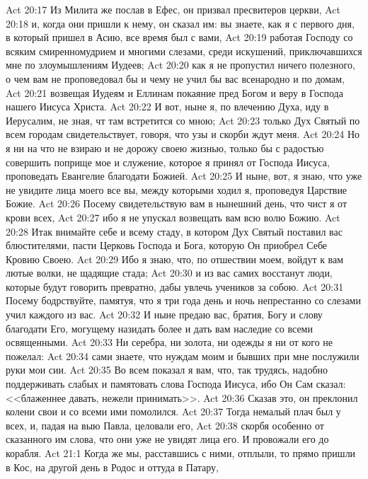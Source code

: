 \rsbpar\vs Act 20:17 Из Милита же послав в Ефес, он призвал пресвитеров церкви,
\vs Act 20:18 и, когда они пришли к нему, он сказал им: вы знаете, как я с первого дня, в который пришел в Асию, все время был с вами,
\vs Act 20:19 работая Господу со всяким смиренномудрием и многими слезами, среди искушений, приключавшихся мне по злоумышлениям Иудеев;
\vs Act 20:20 как я не пропустил ничего полезного, о чем вам не проповедовал бы и чему не учил бы вас всенародно и по домам,
\vs Act 20:21 возвещая Иудеям и Еллинам покаяние пред Богом и веру в Господа нашего Иисуса Христа.
\vs Act 20:22 И вот, ныне я, по влечению Духа, иду в Иерусалим, не зная, чт там встретится со мною;
\vs Act 20:23 только Дух Святый по всем городам свидетельствует, говоря, что узы и скорби ждут меня.
\vs Act 20:24 Но я ни на что не взираю и не дорожу своею жизнью, только бы с радостью совершить поприще мое и служение, которое я принял от Господа Иисуса, проповедать Евангелие благодати Божией.
\vs Act 20:25 И ныне, вот, я знаю, что уже не увидите лица моего все вы, между которыми ходил я, проповедуя Царствие Божие.
\vs Act 20:26 Посему свидетельствую вам в нынешний день, что чист я от крови всех,
\vs Act 20:27 ибо я не упускал возвещать вам всю волю Божию.
\vs Act 20:28 Итак внимайте себе и всему стаду, в котором Дух Святый поставил вас блюстителями, пасти Церковь Господа и Бога, которую Он приобрел Себе Кровию Своею.
\vs Act 20:29 Ибо я знаю, что, по отшествии моем, войдут к вам лютые волки, не щадящие стада;
\vs Act 20:30 и из вас самих восстанут люди, которые будут говорить превратно, дабы увлечь учеников за собою.
\vs Act 20:31 Посему бодрствуйте, памятуя, что я три года день и ночь непрестанно со слезами учил каждого из вас.
\vs Act 20:32 И ныне предаю вас, братия, Богу и слову благодати Его, могущему назидать  более и дать вам наследие со всеми освященными.
\vs Act 20:33 Ни серебра, ни золота, ни одежды я ни от кого не пожелал:
\vs Act 20:34 сами знаете, что нуждам моим и  бывших при мне послужили руки мои сии.
\vs Act 20:35 Во всем показал я вам, что, так трудясь, надобно поддерживать слабых и памятовать слова Господа Иисуса, ибо Он Сам сказал: <<блаженнее давать, нежели принимать>>.
\vs Act 20:36 Сказав это, он преклонил колени свои и со всеми ими помолился.
\vs Act 20:37 Тогда немалый плач был у всех, и, падая на выю Павла, целовали его,
\vs Act 20:38 скорбя особенно от сказанного им слова, что они уже не увидят лица его. И провожали его до корабля.
\vs Act 21:1 Когда же мы, расставшись с ними, отплыли, то прямо пришли в Кос, на другой день в Родос и оттуда в Патару,
